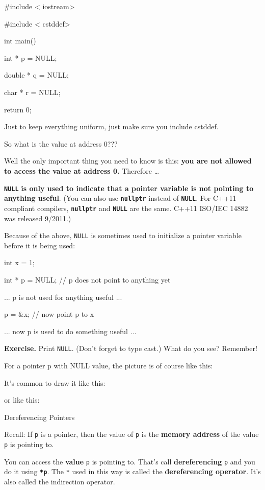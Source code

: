 \begin{ex}
\begin{consolethree}[escapeinside=||]
\begin{consolethree}[escapeinside=||]
\#include < iostream\textgreater{}

\#include < cstddef\textgreater{}

int main()

{

int * p = NULL;

double * q = NULL;

char * r = NULL;

return 0;

}
\end{consolethree}
Just to keep everything uniform, just make sure you include cstddef.

So what is the value at address 0???

Well the only important thing you need to know is this: \textbf{you are
not allowed to access the value at address 0. }Therefore \ldots{}

\texttt{\textbf{NULL}}\textbf{ is only used to indicate that a pointer
variable is not pointing to anything useful}. (You can also use
\texttt{\textbf{nullptr}} instead of \texttt{\textbf{NULL}}. For C++11
compliant compilers, \texttt{\textbf{nullptr}} and \texttt{\textbf{NULL}}
are the same. C++11 ISO/IEC 14882 was released 9/2011.)

Because of the above, \texttt{NULL} is sometimes used to initialize a
pointer variable before it is being used:

\begin{consolethree}[escapeinside=||]

int x = 1;

int * p = NULL; // p does not point to anything yet

... p is not used for anything useful ...

p = \&x; // now point p to x

... now p is used to do something useful ...
\end{consolethree}
\textbf{Exercise.} Print \texttt{NULL}. (Don't forget to type cast.) What
do you see? Remember!

For a pointer p with NULL value, the picture is of course like this:

It's common to draw it like this:

or like this:

Dereferencing Pointers

Recall: If \texttt{p} is a pointer, then the value of \texttt{p} is the
\textbf{memory address} of the value \texttt{p} is pointing to.

You can access the \textbf{value} \texttt{p} is pointing to. That's call
\textbf{dereferencing} \texttt{p} and you do it using \texttt{\textbf{*p}}.
The \texttt{*} used in this way is called the \textbf{dereferencing
operator}. It's also called the indirection operator.


\end{consolethree}
\end{ex}
